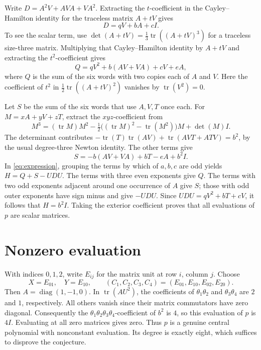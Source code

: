 \documentclass[11pt]{article}
\DeclareMathOperator{\tr}{tr}
\begin{document}
Write \(D=A^2V+AVA+VA^2\). Extracting the \(t\)-coefficient in the
Cayley--Hamilton identity for the traceless matrix \(A+tV\) gives
\[
    D=qV+bA+cI.
\]
To see the scalar term, use
\(\det(A+tV)=\frac13\tr((A+tV)^3)\) for a traceless size-three matrix.
Multiplying that Cayley--Hamilton identity by \(A+tV\) and extracting the
\(t^2\)-coefficient gives
\[
    Q=qV^2+b(AV+VA)+cV+eA,
\]
where \(Q\) is the sum of the six words with two copies each of \(A\) and
\(V\). Here the coefficient of \(t^2\) in \(\tfrac12\tr((A+tV)^2)\)
vanishes by \(\tr(V^2)=0\).

Let \(S\) be the sum of the six words that use \(A,V,T\) once each.
For \(M=xA+yV+zT\), extract the \(xyz\)-coefficient from
\[
 M^3=(\tr M)M^2-\tfrac12\bigl((\tr M)^2-\tr(M^2)\bigr)M+\det(M)I.
\]
The determinant contributes \(-\tr(T)\tr(AV)+\tr(AVT+ATV)=b^2\), by the
usual degree-three Newton identity. The other terms give
\[
    S=-b(AV+VA)+bT-eA+b^2I.
\]
In \eqref{eq:expression}, grouping the terms by which of \(a,b,c\) are
odd yields \(H=Q+S-UDU\). The terms with three even exponents give \(Q\).
The terms with two odd exponents adjacent around one occurrence of \(A\)
give \(S\); those with odd outer exponents have sign minus and give
\(-UDU\). Since \(UDU=qV^2+bT+cV\), it follows that \(H=b^2 I\).
Taking the exterior coefficient proves that all evaluations of \(p\) are
scalar matrices.

\section*{Nonzero evaluation}

With indices \(0,1,2\), write \(E_{ij}\) for the matrix unit at row
\(i\), column \(j\). Choose
\[
 X=E_{01},\quad Y=E_{10},\qquad
 (C_1,C_2,C_3,C_4)=(E_{01},E_{10},E_{02},E_{20}).
\]
Then \(A=\operatorname{diag}(1,-1,0)\). In \(\tr(AU^2)\), the coefficients
of \(\theta_1\theta_2\) and \(\theta_3\theta_4\) are \(2\) and \(1\),
respectively. All others vanish since their matrix commutators have zero
diagonal. Consequently the \(\theta_1\theta_2\theta_3\theta_4\)-coefficient
of \(b^2\) is \(4\), so this evaluation of \(p\) is \(4I\). Evaluating at
all zero matrices gives zero. Thus \(p\) is a genuine central polynomial
with nonconstant evaluation. Its degree is exactly eight, which suffices
to disprove the conjecture.
\end{document}
